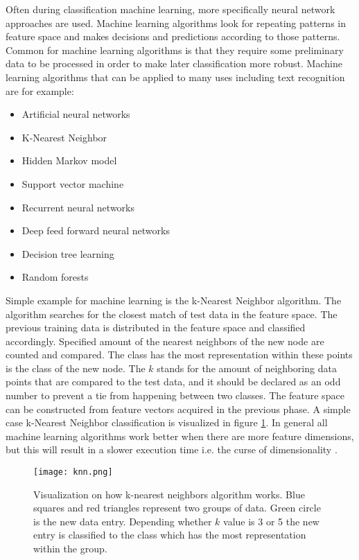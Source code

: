 \documentclass{article}
\begin{document}
        Often during classification machine learning, more specifically neural network approaches are used. Machine learning algorithms look for repeating patterns in feature space and makes decisions and predictions according to those patterns. Common for machine learning algorithms is that they require some preliminary data to be processed in order to make later classification more robust. Machine learning algorithms that can be applied to many uses including text recognition are for example:

        \begin{itemize}
          \item Artificial neural networks
          \item K-Nearest Neighbor
          \item Hidden Markov model
          \item Support vector machine
          \item Recurrent neural networks
          \item Deep feed forward neural networks
          \item Decision tree learning
          \item Random forests  \cite{SAS}
        \end{itemize}

          Simple example for machine learning is the k-Nearest Neighbor algorithm. The algorithm searches for the closest match of test data in the feature space. The previous training data is distributed in the feature space and classified accordingly. Specified amount of the nearest neighbors of the new node are counted and compared. The class has the most representation within these points is the class of the new node. The $k$ stands for the amount of neighboring data points that are compared to the test data, and it should be declared as an odd number to prevent a tie from happening between two classes. The feature space can be constructed from feature vectors acquired in the previous phase. A simple case k-Nearest Neighbor classification is visualized in figure \ref{fig:knn}. In general all machine learning algorithms work better when there are more feature dimensions, but this will result in a slower execution time i.e. the curse of dimensionality \cite{Beyer}.

          \begin{figure}[!ht]
            \centering
            \texttt{[image: knn.png]}
            \caption{Visualization on how k-nearest neighbors algorithm works. Blue squares
                      and red triangles represent two groups of data. Green circle is the new
                      data entry. Depending whether $k$ value is 3 or 5 the new entry is classified
                      to the class which has the most representation within the group.\label{fig:knn} }
          \end{figure}
\end{document}
